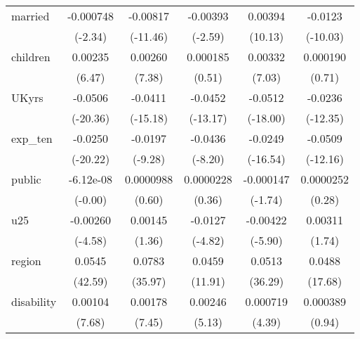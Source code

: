 {\begin{longtable}{l*{5}{c}}
married     &   -0.000748\sym{*}  &    -0.00817\sym{***}&    -0.00393\sym{**} &     0.00394\sym{***}&     -0.0123\sym{***}\\
            &     (-2.34)         &    (-11.46)         &     (-2.59)         &     (10.13)         &    (-10.03)         \\
children    &     0.00235\sym{***}&     0.00260\sym{***}&    0.000185         &     0.00332\sym{***}&    0.000190         \\
            &      (6.47)         &      (7.38)         &      (0.51)         &      (7.03)         &      (0.71)         \\
UKyrs       &     -0.0506\sym{***}&     -0.0411\sym{***}&     -0.0452\sym{***}&     -0.0512\sym{***}&     -0.0236\sym{***}\\
            &    (-20.36)         &    (-15.18)         &    (-13.17)         &    (-18.00)         &    (-12.35)         \\
exp\_ten     &     -0.0250\sym{***}&     -0.0197\sym{***}&     -0.0436\sym{***}&     -0.0249\sym{***}&     -0.0509\sym{***}\\
            &    (-20.22)         &     (-9.28)         &     (-8.20)         &    (-16.54)         &    (-12.16)         \\
public      &   -6.12e-08         &   0.0000988         &   0.0000228         &   -0.000147         &   0.0000252         \\
            &     (-0.00)         &      (0.60)         &      (0.36)         &     (-1.74)         &      (0.28)         \\
u25         &    -0.00260\sym{***}&     0.00145         &     -0.0127\sym{***}&    -0.00422\sym{***}&     0.00311         \\
            &     (-4.58)         &      (1.36)         &     (-4.82)         &     (-5.90)         &      (1.74)         \\
region      &      0.0545\sym{***}&      0.0783\sym{***}&      0.0459\sym{***}&      0.0513\sym{***}&      0.0488\sym{***}\\
            &     (42.59)         &     (35.97)         &     (11.91)         &     (36.29)         &     (17.68)         \\
disability  &     0.00104\sym{***}&     0.00178\sym{***}&     0.00246\sym{***}&    0.000719\sym{***}&    0.000389         \\
            &      (7.68)         &      (7.45)         &      (5.13)         &      (4.39)         &      (0.94)         \\

\end{longtable}}
